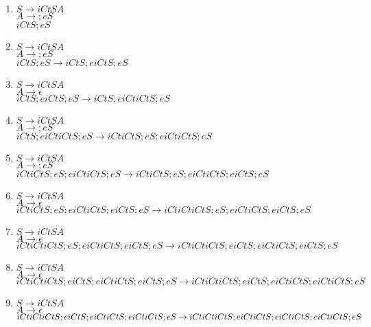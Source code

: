 \documentclass[12pt,letterpaper]{article}
\begin{document}
\begin{enumerate}
\item $S \rightarrow iCtSA$ \\ $A \rightarrow ;eS$ \\
$iCtS;eS$\\

\item $S \rightarrow iCtSA$ \\ $A \rightarrow ;eS$ \\
$iCtS;eS \rightarrow iCtS;eiCtS;eS$\\
 
\item $S \rightarrow iCtSA$ \\ $A \rightarrow \epsilon$ \\
$iCtS;eiCtS;eS \rightarrow iCtS;eiCtiCtS;eS$\\

\item $S \rightarrow iCtSA$ \\ $A \rightarrow ;eS$ \\
$iCtS;eiCtiCtS;eS \rightarrow iCtiCtS;eS;eiCtiCtS;eS$\\

\item $S \rightarrow iCtSA$ \\ $A \rightarrow ;eS$ \\
$iCtiCtS;eS;eiCtiCtS;eS \rightarrow iCtiCtS;eS;eiCtiCtS;eiCtS;eS$\\

\item $S \rightarrow iCtSA$ \\ $A \rightarrow \epsilon$ \\
$iCtiCtS;eS;eiCtiCtS;eiCtS;eS \rightarrow iCtiCtiCtS;eS;eiCtiCtS;eiCtS;eS$\\


\item $S \rightarrow iCtSA$ \\ $A \rightarrow \epsilon$ \\
$iCtiCtiCtS;eS;eiCtiCtS;eiCtS;eS \rightarrow iCtiCtiCtS;eiCtS;eiCtiCtS;eiCtS;eS$\\


\item $S \rightarrow iCtSA$ \\ $A \rightarrow \epsilon$ \\
$iCtiCtiCtS;eiCtS;eiCtiCtS;eiCtS;eS \rightarrow iCtiCtiCtS;eiCtS;eiCtiCtS;eiCtiCtS;eS$\\


\item $S \rightarrow iCtSA$ \\ $A \rightarrow \epsilon$ \\
$iCtiCtiCtS;eiCtS;eiCtiCtS;eiCtiCtS;eS \rightarrow \\ iCtiCtiCtS;eiCtiCtS;eiCtiCtS;eiCtiCtS;eS$\\



\end{enumerate}
\end{document}
